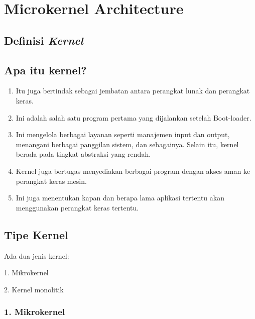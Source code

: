 \chapter{Microkernel Architecture}
	\author{Bryan Elmer Purnomo, Richard Haryono Yang, Paris Matio}
	

\section{Definisi \textit{Kernel}}

	\section*{Apa itu kernel?}
	\begin{enumerate}
		
		\item Itu juga bertindak sebagai jembatan antara perangkat lunak dan perangkat keras. 
		
		\item Ini adalah salah satu program pertama yang dijalankan setelah Boot-loader.
		
		\item Ini mengelola berbagai layanan seperti manajemen input dan output, menangani berbagai panggilan sistem, dan sebagainya. Selain itu, kernel berada pada tingkat abstraksi yang rendah.
		
		\item Kernel juga bertugas menyediakan berbagai program dengan akses aman ke perangkat keras mesin. 
		
		\item Ini juga menentukan kapan dan berapa lama aplikasi tertentu akan menggunakan perangkat keras tertentu.
		
	\end{enumerate}	
	
	\vskip0.5cm

\section*{Tipe Kernel}

Ada dua jenis kernel:

1. Mikrokernel

2. Kernel monolitik

\vskip0.5cm

\subsection*{1. Mikrokernel}

